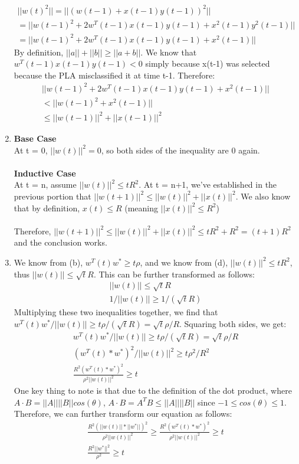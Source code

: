 \documentclass[12pt]{article}
\begin{document}
\begin{enumerate}[label=(\alph*)]
	\begin{gather*}
		||w(t)^2|| = ||(w(t-1) + x(t-1)y(t-1))^2||
		\\ = ||w(t-1)^2 + 2w^T(t-1)x(t-1)y(t-1) + x^2(t-1)y^2(t-1)||
		\\ = ||w(t-1)^2 + 2w^T(t-1)x(t-1)y(t-1) + x^2(t-1)||		
	\end{gather*}
	By definition, $||a|| + ||b|| \ge ||a + b||$. We know that $w^T(t-1)x(t-1)y(t-1) < 0$ simply because x(t-1) was selected because the PLA misclassified it at time t-1. Therefore:
	\begin{gather*}
		||w(t-1)^2 + 2w^T(t-1)x(t-1)y(t-1) + x^2(t-1)||
		\\ < ||w(t-1)^2 + x^2(t-1)||
		\\ \le ||w(t-1)||^2 + ||x(t-1)||^2
	\end{gather*}
	\item \textbf{Base Case}
	\\ At t = 0, $||w(t)||^2 = 0$, so both sides of the inequality are 0 again.
	\\ \\ \textbf{Inductive Case}
	\\ At t = n, assume $||w(t)||^2 \le tR^2$. At t = n+1, we've established in the previous portion that $||w(t+1)||^2 \le ||w(t)||^2 + ||x(t)||^2$. We also know that by definition, $x(t) \le R$ (meaning $||x(t)||^2 \le R^2$)
	\\ \\ Therefore, $||w(t+1)||^2 \le ||w(t)||^2 + ||x(t)||^2 \le tR^2 + R^2 = (t+1)R^2$ and the conclusion works.
	\item We know from (b), $w^T(t)w^* \ge t\rho$, and we know from (d), $||w(t)||^2 \le tR^2$, thus $||w(t)|| \le \sqrt{t}R$. This can be further transformed as follows:
	\begin{gather*}
		||w(t)|| \le \sqrt{t}R
		\\ 1/||w(t)|| \ge 1/(\sqrt{t}R)
	\end{gather*}
	Multiplying these two inequalities together, we find that $w^T(t)w^*/||w(t)|| \ge t\rho/(\sqrt{t}R) = \sqrt{t}\rho/R$. Squaring both sides, we get:
	\begin{gather*}
		w^T(t)w^*/||w(t)|| \ge t\rho/(\sqrt{t}R) = \sqrt{t}\rho/R
		\\ (w^T(t) * w^*)^2/||w(t)||^2 \ge t\rho^2/R^2
		\\ \frac{R^2(w^T(t) * w^*)^2}{\rho^2||w(t)||^2} \ge t
	\end{gather*}
	One key thing to note is that due to the definition of the dot product, where $A \cdot B = ||A|| ||B|| cos(\theta)$, $A \cdot B = A^T B \le ||A|| ||B||$ since $-1 \le cos(\theta) \le 1$. Therefore, we can further transform our equation as follows:
	\begin{gather*}
		\frac{R^2(||w(t)||*||w^*||)^2}{\rho^2||w(t)||^2} \ge \frac{R^2(w^T(t) * w^*)^2}{\rho^2||w(t)||^2} \ge t
		\\ \frac{R^2||w^*||^2}{\rho^2} \ge t
	\end{gather*}
\end{enumerate}
\end{document}

